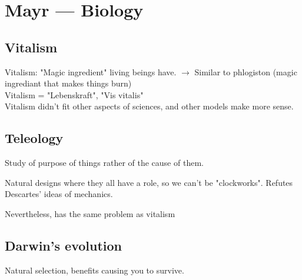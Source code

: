 \documentclass{article}
\begin{document}
	\section{Mayr --- Biology}
	\subsection{Vitalism}
		Vitalism: "Magic ingredient" living beings have. $\rightarrow$ Similar to phlogiston (magic ingrediant that makes things burn) \\
		Vitalism = "Lebenskraft", "Vis vitalis" \\
		Vitalism didn't fit other aspects of sciences, and other models make more sense. \\
		
	\subsection{Teleology}
		Study of purpose of things rather of the cause of them.

		Natural designs where they all have a role, so we can't be "clockworks". 
		Refutes Descartes' ideas of mechanics. 

		Nevertheless, has the same problem as vitalism

	\subsection{Darwin's evolution}
		Natural selection, benefits causing you to survive.
		
\end{document}
